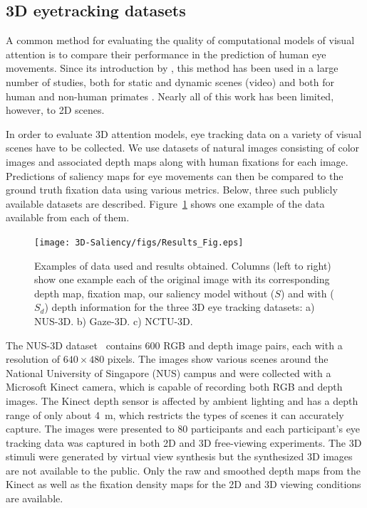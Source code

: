 \subsection{3D eyetracking datasets}
A common method for evaluating the quality of computational models of
visual attention is to compare their performance in the prediction of
human eye movements. Since its introduction by \cite{Parkhurst_etal02a}, this method has been used in a large number
of studies, both for static and dynamic scenes (video) and both for
human and non-human primates \citep[for a recent review see][]{Borji_Itti13}.  Nearly all of this work has been limited, however, to 2D scenes.

In order to evaluate 3D  attention models, eye tracking data on a variety of visual scenes have to be collected. We use  datasets  of natural images consisting of color images and associated depth maps along with human fixations for each image.  Predictions of saliency maps for eye movements can then be compared to the ground truth fixation data using various metrics. Below, three such publicly available datasets are described. Figure~\ref{Fig:Results} shows one example of the data available from each of them. 

\begin{figure}[htbp]
\centering
\texttt{[image: 3D-Saliency/figs/Results\_Fig.eps]}
\makeatletter
\let\@currsize\normalsize
\caption{Examples of data used and results obtained. Columns (left to right) show one example each of the original image with its corresponding depth map, fixation map, our saliency model without ($S$) and with ($S_d$) depth information for the three 3D eye tracking datasets: a) NUS-3D. b) Gaze-3D. c) NCTU-3D.}
\label{Fig:Results}
\end{figure}

The NUS-3D dataset~\citep{Lang_etal12} contains 600 RGB and depth image pairs, each with a resolution of $640\times480$ pixels. The images show various scenes around the National University of Singapore
(NUS) campus and were collected with a Microsoft Kinect camera, which
is capable of recording both RGB and depth images. The Kinect depth sensor is affected by ambient lighting and has a depth range of only
about 4~m, which restricts the types of scenes it can accurately capture. The images were presented to 80 participants and each participant's eye tracking data was captured in both 2D and 3D free-viewing experiments. The 3D stimuli were generated by virtual view synthesis \cite[see][for details]{Lang_etal12} but the synthesized 3D images are not available to the public. Only the raw
and smoothed depth maps from the Kinect as well as the fixation density
maps for the 2D and 3D viewing conditions are available.

